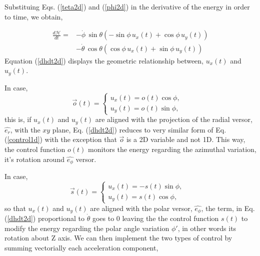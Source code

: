 \documentclass[prd,twocolumn,nofootinbib,showpacs]{revtex4-1}
\begin{document}
Substituing Eqs. (\ref{teta2d}) and (\ref{phi2d}) in the derivative of the energy in order to time, we obtain,

\begin{align}
    \frac{d\mathcal{H}}{dt}=&-\dot{\phi}\,\sin{\theta}(-\sin{\phi}\,u_x(t)+\cos{\phi}\,u_y(t)) \nonumber \\ 
    &-\dot{\theta}\,\cos{\theta}(\cos{\phi}\,u_x(t)+\sin{\phi}\,u_y(t))
    \label{dhdt2d}
\end{align}
Equation (\ref{dhdt2d}) displays the geometric relationship between, $u_x(t)$ and $u_y(t)$.
\par In case,
\begin{equation}
   \Vec{o}(t)= \begin{cases}
    u_x(t)=o(t) \cos{\phi}, &\\
    u_y(t)=o(t) \sin{\phi}, &
    \end{cases}
\end{equation}
this is, if $u_x(t)$ and $u_y(t)$ are aligned with the  projection of the radial versor, $\hat{e_r}$, with the $xy$ plane, Eq. (\ref{dhdt2d}) reduces to very similar form of Eq. (\ref{control1d}) with the exception that $\Vec{o}$ is a 2D variable and not 1D. This way, the control function $o(t)$ monitors the energy regarding the azimuthal variation, it's rotation around $\hat{e_{\phi}}$ versor. 
\par In case,
\begin{equation}
    \Vec{s}(t)=\begin{cases}
    u_x(t)=-s(t) \sin{\phi}, &\\
    u_y(t)=s(t) \cos{\phi}, &
    \end{cases}
\end{equation}
so that $u_x(t)$ and $u_y(t)$ are aligned with the polar versor, $\hat{e_{\phi}}$, the term, in Eq. (\ref{dhdt2d}) proportional to $\dot{\theta}$ goes to 0 leaving the the control function $s(t)$ to modify the energy regarding the polar angle variation $\phi'$, in other words its rotation about Z axis. We can then implement the two types of control by summing vectorially each acceleration component, 
\end{document}

